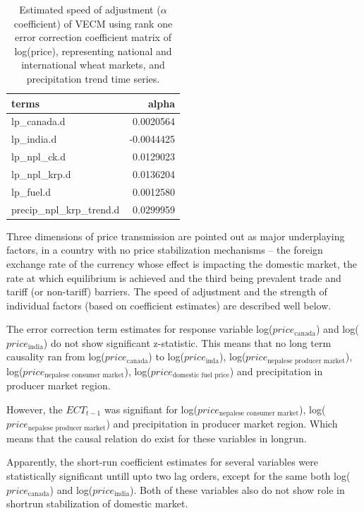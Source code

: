 \documentclass[12pt,]{article}
\begin{document}
\begin{table}

\caption{\label{tab:wheat-cajo-alpha}Estimated speed of adjustment ($\alpha$ coefficient) of VECM using rank one error correction coefficient matrix of log(price), representing national and international wheat markets, and precipitation trend time series.}
\centering
\begin{tabular}[t]{lr}
\toprule
terms & alpha\\
\midrule
lp\_canada.d & 0.0020564\\
lp\_india.d & -0.0044425\\
lp\_npl\_ck.d & 0.0129023\\
lp\_npl\_krp.d & 0.0136204\\
lp\_fuel.d & 0.0012580\\
\addlinespace
precip\_npl\_krp\_trend.d & 0.0299959\\
\bottomrule
\end{tabular}
\end{table}

Three dimensions of price transmission are pointed out as major underplaying factors, in a country with no price stabilization mechanisms -- the foreign exchange rate of the currency whose effect is impacting the domestic market, the rate at which equilibrium is achieved and the third being prevalent trade and tariff (or non-tariff) barriers. The speed of adjustment and the strength of individual factors (based on coefficient estimates) are described well below.

The error correction term estimates for response variable log(\(price_{\textrm{canada}}\)) and log(\(price_{\textrm{india}}\)) do not show significant z-statistic. This means that no long term causality ran from log(\(price_{\textrm{canada}}\)) to log(\(price_{\textrm{inda}}\)), log(\(price_{\textrm{nepalese producer market}}\)), log(\(price_{\textrm{nepalese consumer market}}\)), log(\(price_{\textrm{domestic fuel price}}\)) and precipitation in producer market region.

However, the \(ECT_{t-1}\) was signifiant for log(\(price_{\textrm{nepalese consumer market}}\)), log(\(price_{\textrm{nepalese producer market}}\)) and precipitation in producer market region. Which means that the causal relation do exist for these variables in longrun.

Apparently, the short-run coefficient estimates for several variables were statistically significant untill upto two lag orders, except for the same both log(\(price_{\textrm{canada}}\)) and log(\(price_{\textrm{india}}\)). Both of these variables also do not show role in shortrun stabilization of domestic market.
\end{document}
